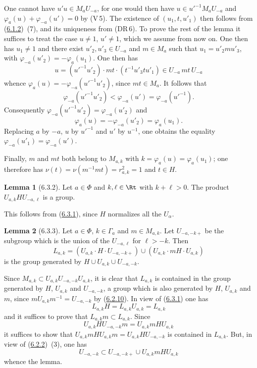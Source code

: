 \documentclass[12pt,a4paper,oneside,english]{smfart}
\makeatletter
\newcommand{\btanchor}[1]{\leavevmode\Hy@raisedlink{\hypertarget{bt:#1}{}}}
\newcommand{\btpageanchor}[1]{\Hy@raisedlink{\hypertarget{p:#1}{}}}
\newcommand{\btref}[1]{\hyperlink{bt:#1}{#1}}
\newcommand{\btpage}[1]{\marginnote{p.~#1}\btpageanchor{#1}}
\newcommand{\pmark}[1]{\btpage{#1}}
\theoremstyle{definition}
\theoremstyle{bt}
\newtheorem{lem}{Lemma}
\makeatother
\begin{document}
One cannot have $u'u\in M_aU_{-a}$, for one would then have
$u\in u'^{-1}M_aU_{-a}$ and $\varphi_a(u)+\varphi_{-a}(u')=0$ by (V\,5).
The existence of $(u_1,t,u'_1)$ then follows from (\btref{6.1.2})~(7), and its
uniqueness from (DR\,6). To prove the rest of the lemma it suffices to
treat the case $u\neq1$, $u'\neq1$, which we assume from now on. One then
has $u_1\neq1$ and there exist $u'_2,u'_3\in U_{-a}$ and $m\in M_a$ such
that $u_1=u'_2mu'_3$, with $\varphi_{-a}(u'_2)=-\varphi_a(u_1)$. One then
has
\[
  u=(u'^{-1}u'_2)\cdot mt\cdot(t^{-1}u'_3tu'_1)\in U_{-a}\,mt\,U_{-a}
\]
\pmark{129}
whence $\varphi_a(u)=-\varphi_{-a}(u'^{-1}u'_2)$, since $mt\in M_a$. It
follows that
\[
  \varphi_{-a}(u'^{-1}u'_2)<\varphi_{-a}(u')=\varphi_{-a}(u'^{-1}).
\]
Consequently $\varphi_{-a}(u'^{-1}u'_2)=\varphi_{-a}(u'_2)$ and
\[
  \varphi_a(u)=-\varphi_{-a}(u'_2)=\varphi_a(u_1).
\]
Replacing $a$ by $-a$, $u$ by $u'^{-1}$ and $u'$ by $u^{-1}$, one obtains
the equality $\varphi_{-a}(u'_1)=\varphi_{-a}(u')$.

Finally, $m$ and $mt$ both belong to $M_{a,k}$ with
$k=\varphi_a(u)=\varphi_a(u_1)$; one therefore has
$\nu(t)=\nu(m^{-1}mt)=r^2_{a,k}=1$ and $t\in H$.

\begin{lem}[6.3.2]\btanchor{6.3.2}
Let $a\in\Phi$ and $k,\ell\in\Rt$ with $k+\ell>0$. The product
$U_{a,k}HU_{-a,\ell}$ is a group.
\end{lem}

This follows from (\btref{6.3.1}), since $H$ normalizes all the $U_{\alpha}$.

\begin{lem}[6.3.3]\btanchor{6.3.3}
Let $a\in\Phi$, $k\in\Gamma_a$ and $m\in M_{a,k}$. Let $U_{-a,-k+}$ be the
subgroup which is the union of the $U_{-a,\ell}$ for $\ell>-k$. Then
\[
  L_{a,k}=(U_{a,k}\cdot H\cdot U_{-a,-k+})\cup(U_{a,k}\cdot mH\cdot U_{a,k})
\]
is the group generated by $H\cup U_{a,k}\cup U_{-a,-k}$.
\end{lem}

Since $M_{a,k}\subset U_{a,k}U_{-a,-k}U_{a,k}$, it is clear that
$L_{a,k}$ is contained in the group generated by $H$, $U_{a,k}$ and
$U_{-a,-k}$, a group which is also generated by $H$, $U_{a,k}$ and $m$,
since $mU_{a,k}m^{-1}=U_{-a,-k}$ by (\btref{6.2.10}). In view of (\btref{6.3.1}) one has
\[
  L_{a,k}H=L_{a,k}U_{a,k}=L_{a,k}
\]
and it suffices to prove that $L_{a,k}m\subset L_{a,k}$. Since
\[
  U_{a,k}HU_{-a,-k}m=U_{a,k}mHU_{a,k}
\]
it suffices to show that $U_{a,k}mHU_{a,k}m=U_{a,k}HU_{-a,-k}$ is contained
in $L_{a,k}$. But, in view of (\btref{6.2.2})~(3), one has
\[
  U_{-a,-k}\subset U_{-a,-k+}\cup U_{a,k}mHU_{a,k}
\]
whence the lemma.
\end{document}
